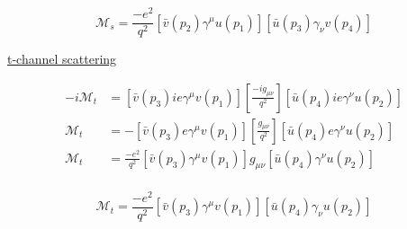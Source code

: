 \documentclass[11pt]{article}
\theoremstyle{definition}
\numberwithin{equation}{section}
\begin{document}
\begin{equation}
\boxed{
    \mathcal{M}_{s} = \frac{-e^2}{q^2} [\bar{v}(p_2)\gamma^{\mu}u(p_1)]
    [\bar{u}(p_3)\gamma_{\nu}v(p_4)]
}
\end{equation}

\underline{t-channel scattering}

\begin{align}
    -i\mathcal{M}_{t} &= [\bar{v}(p_3)ie\gamma^{\mu}v(p_1)] 
    \left[ \frac{-ig_{\mu\nu}}{q^2} \right]
    [\bar{u}(p_4)ie\gamma^{\nu}u(p_2)]\\
    \mathcal{M}_{t} &= -[\bar{v}(p_3)e\gamma^{\mu}v(p_1)] 
    \left[ \frac{g_{\mu\nu}}{q^2} \right]
    [\bar{u}(p_4)e\gamma^{\nu}u(p_2)]\\
    \mathcal{M}_{t} &= \frac{-e^2}{q^2} [\bar{v}(p_3)\gamma^{\mu}v(p_1)]
    g_{\mu\nu}[\bar{u}(p_4)\gamma^{\nu}u(p_2)]\\
\end{align}

\begin{equation}
\boxed{
    \mathcal{M}_{t} = \frac{-e^2}{q^2} [\bar{v}(p_3)\gamma^{\mu}v(p_1)]
    [\bar{u}(p_4)\gamma_{\nu}u(p_2)]
}
\end{equation}





\end{document}
